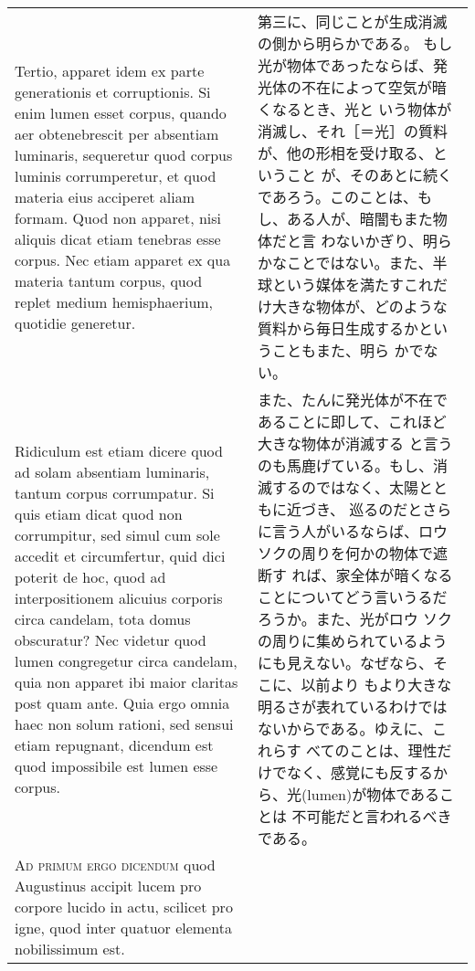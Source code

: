\documentclass[10pt]{jsarticle} %
\begin{document}
\begin{longtable}{p{21em}p{21em}}
\\


Tertio,
apparet idem ex parte generationis et corruptionis. Si enim lumen esset
corpus, quando aer obtenebrescit per absentiam luminaris, sequeretur
quod corpus luminis corrumperetur, et quod materia eius acciperet aliam
formam. Quod non apparet, nisi aliquis dicat etiam tenebras esse
corpus. Nec etiam apparet ex qua materia tantum corpus, quod replet
medium hemisphaerium, quotidie generetur. 



&


第三に、同じことが生成消滅の側から明らかである。
もし光が物体であったならば、発光体の不在によって空気が暗くなるとき、光と
 いう物体が消滅し、それ［＝光］の質料が、他の形相を受け取る、ということ
 が、そのあとに続くであろう。このことは、もし、ある人が、暗闇もまた物体だと言
 わないかぎり、明らかなことではない。また、半球という媒体を満たすこれだ
 け大きな物体が、どのような質料から毎日生成するかということもまた、明ら
 かでない。

\\


Ridiculum est etiam dicere
quod ad solam absentiam luminaris, tantum corpus corrumpatur. Si quis
etiam dicat quod non corrumpitur, sed simul cum sole accedit et
circumfertur, quid dici poterit de hoc, quod ad interpositionem alicuius
corporis circa candelam, tota domus obscuratur? Nec videtur quod lumen
congregetur circa candelam, quia non apparet ibi maior claritas post
quam ante. Quia ergo omnia haec non solum rationi, sed sensui etiam
repugnant, dicendum est quod impossibile est lumen esse corpus.


&

また、たんに発光体が不在であることに即して、これほど大きな物体が消滅する
 と言うのも馬鹿げている。もし、消滅するのではなく、太陽とともに近づき、
 巡るのだとさらに言う人がいるならば、ロウソクの周りを何かの物体で遮断す
 れば、家全体が暗くなることについてどう言いうるだろうか。また、光がロウ
 ソクの周りに集められているようにも見えない。なぜなら、そこに、以前より
 もより大きな明るさが表れているわけではないからである。ゆえに、これらす
 べてのことは、理性だけでなく、感覚にも反するから、光(lumen)が物体であることは
 不可能だと言われるべきである。

\\


{\scshape  Ad primum ergo dicendum} quod Augustinus
accipit lucem pro corpore lucido in actu, scilicet pro igne, quod inter
quatuor elementa nobilissimum est.


\end{longtable}
\end{document}
